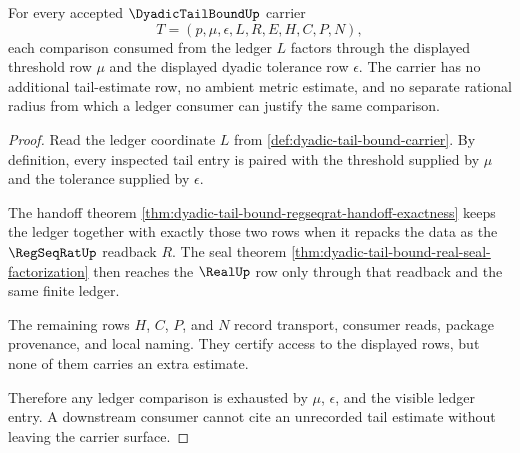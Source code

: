 \begin{theorem}
\label{thm:dyadic-tail-bound-ledger-threshold-exhaustion}
For every accepted $\DyadicTailBoundUp$ carrier
$$
T=(p,\mu,\epsilon,L,R,E,H,C,P,N),
$$
each comparison consumed from the ledger $L$ factors through the displayed threshold row $\mu$ and the displayed dyadic tolerance row $\epsilon$. The carrier has no additional tail-estimate row, no ambient metric estimate, and no separate rational radius from which a ledger consumer can justify the same comparison.
\end{theorem}
\begin{proof}
Read the ledger coordinate $L$ from \autoref{def:dyadic-tail-bound-carrier}. By definition, every inspected tail entry is paired with the threshold supplied by $\mu$ and the tolerance supplied by $\epsilon$.

The handoff theorem \autoref{thm:dyadic-tail-bound-regseqrat-handoff-exactness} keeps the ledger together with exactly those two rows when it repacks the data as the $\RegSeqRatUp$ readback $R$. The seal theorem \autoref{thm:dyadic-tail-bound-real-seal-factorization} then reaches the $\RealUp$ row only through that readback and the same finite ledger.

The remaining rows $H$, $C$, $P$, and $N$ record transport, consumer reads, package provenance, and local naming. They certify access to the displayed rows, but none of them carries an extra estimate.

Therefore any ledger comparison is exhausted by $\mu$, $\epsilon$, and the visible ledger entry. A downstream consumer cannot cite an unrecorded tail estimate without leaving the carrier surface.
\end{proof}

